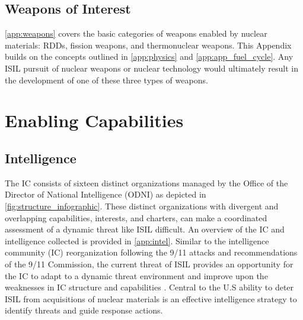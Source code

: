\documentclass{report}
\begin{document}
\section{Weapons of Interest}


\autoref{app:weapons}  covers the basic categories of weapons enabled by nuclear materials: RDDs, fission weapons, and thermonuclear weapons. This Appendix builds on the concepts outlined in \autoref{app:physics} and \autoref{app:app_fuel_cycle}. Any ISIL pursuit of nuclear weapons or nuclear technology would ultimately result in the development of one of these three types of weapons.





\chapter{Enabling Capabilities }

\section{Intelligence }


The IC consists of sixteen distinct organizations managed by the Office of the Director of National Intelligence (ODNI) as depicted in \autoref{fig:structure_infographic}. These distinct organizations with divergent and overlapping capabilities, interests, and charters, can make a coordinated assessment of a dynamic threat like ISIL difficult. An overview of the IC and intelligence collected is provided in \autoref{app:intel}. Similar to the intelligence community (IC) reorganization following the 9/11 attacks and recommendations of the 9/11 Commission, the current threat of ISIL provides an opportunity for the IC to adapt to a dynamic threat environment and improve upon the weaknesses in IC structure and capabilities \cite{Kean2004}. Central to the U.S ability to deter ISIL from acquisitions of nuclear materials is an effective intelligence strategy to identify threats and guide response actions. 
\end{document}
